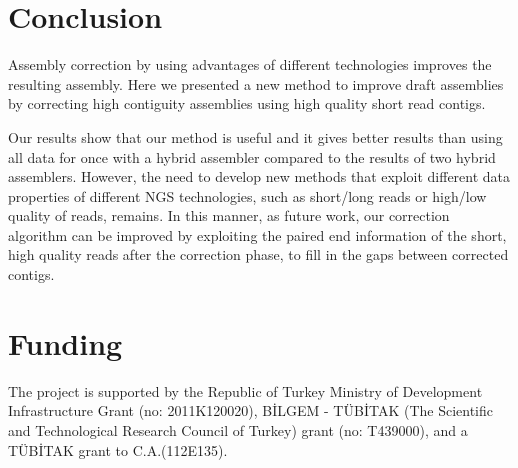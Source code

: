 \documentclass[12pt,a4paper]{cibb}
\begin{document}
\section{\bf Conclusion}

Assembly correction by using advantages of different technologies improves the resulting assembly. Here we presented a new method to improve draft assemblies by correcting high contiguity assemblies using high quality short read contigs. 

Our results show that our method is useful and it gives better results than using all data for once with a hybrid assembler compared to the results of two hybrid assemblers. However, the need to develop new methods that exploit different data properties of different NGS technologies, such as short/long reads or high/low quality of reads, remains. In this manner, as future work, our correction algorithm can be improved by exploiting the paired end information of the short, high quality reads after the correction phase, to fill in the gaps between corrected contigs.

\section*{\bf Funding}
The project is supported by the Republic of Turkey Ministry of Development Infrastructure Grant (no: 2011K120020), B\.{I}LGEM \-- T\"{U}B\.{I}TAK (The Scientific and Technological Research Council of Turkey) grant (no: T439000), and a T\"{U}B\.{I}TAK grant to C.A.(112E135).\\

\newpage
\end{document}
